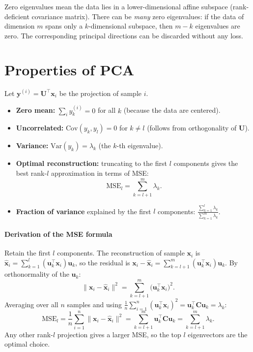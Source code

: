 \documentclass[11pt, oneside]{book}
\newcommand{\T}{^{\top}}
\begin{document}
\begin{notebox}[title={Zero eigenvalues}]
Zero eigenvalues mean the data lies in a lower-dimensional affine subspace (rank-deficient
covariance matrix). There can be \emph{many} zero eigenvalues: if the data of dimension
$m$ spans only a $k$-dimensional subspace, then $m - k$ eigenvalues are zero.
The corresponding principal directions can be discarded without any loss.
\end{notebox}


\section{Properties of PCA}
\label{sec:pca-properties}

Let $\bm{y}^{(i)} = \bm{U}\T\bm{x}_i$ be the projection of sample $i$.

\begin{thmbox}[title={Key Properties of PCA Projections}]
\begin{itemize}
  \item \textbf{Zero mean:} $\sum_i y_k^{(i)} = 0$ for all $k$ (because the data are centered).
  \item \textbf{Uncorrelated:} $\mathrm{Cov}(y_k, y_l) = 0$ for $k \neq l$
        (follows from orthogonality of $\bm{U}$).
  \item \textbf{Variance:} $\mathrm{Var}(y_k) = \lambda_k$ (the $k$-th eigenvalue).
  \item \textbf{Optimal reconstruction:} truncating to the first $l$ components gives
        the best rank-$l$ approximation in terms of MSE:
        \[
          \mathrm{MSE}_l = \sum_{k=l+1}^{m} \lambda_k.
        \]
  \item \textbf{Fraction of variance} explained by the first $l$ components:
        $\frac{\sum_{k=1}^l \lambda_k}{\sum_{k=1}^m \lambda_k}$.
\end{itemize}
\end{thmbox}

\paragraph{Derivation of the MSE formula}
Retain the first $l$ components.
The reconstruction of sample $\bm{x}_i$ is
$\hat{\bm{x}}_i = \sum_{k=1}^l (\bm{u}_k\T\bm{x}_i)\bm{u}_k$,
so the residual is
$\bm{x}_i - \hat{\bm{x}}_i = \sum_{k=l+1}^m (\bm{u}_k\T\bm{x}_i)\bm{u}_k$.
By orthonormality of the $\bm{u}_k$:
\[
  \|\bm{x}_i - \hat{\bm{x}}_i\|^2 = \sum_{k=l+1}^m \bigl(\bm{u}_k\T\bm{x}_i\bigr)^2.
\]
Averaging over all $n$ samples and using
$\frac{1}{n}\sum_{i=1}^n (\bm{u}_k\T\bm{x}_i)^2 = \bm{u}_k\T\bm{C}\bm{u}_k = \lambda_k$:
\[
  \mathrm{MSE}_l
  = \frac{1}{n}\sum_{i=1}^n \|\bm{x}_i - \hat{\bm{x}}_i\|^2
  = \sum_{k=l+1}^m \bm{u}_k\T\bm{C}\bm{u}_k
  = \sum_{k=l+1}^m \lambda_k.
\]
Any other rank-$l$ projection gives a larger MSE, so the top $l$ eigenvectors are
the optimal choice.
\end{document}
